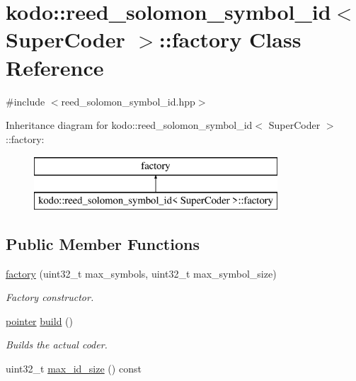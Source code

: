 \hypertarget{classkodo_1_1reed__solomon__symbol__id_1_1factory}{\section{kodo\-:\-:reed\-\_\-solomon\-\_\-symbol\-\_\-id$<$ Super\-Coder $>$\-:\-:factory Class Reference}
\label{classkodo_1_1reed__solomon__symbol__id_1_1factory}
}


{\ttfamily \#include $<$reed\-\_\-solomon\-\_\-symbol\-\_\-id.\-hpp$>$}

Inheritance diagram for kodo\-:\-:reed\-\_\-solomon\-\_\-symbol\-\_\-id$<$ Super\-Coder $>$\-:\-:factory\-:\begin{figure}[H]
\begin{center}
\leavevmode
\includegraphics[height=2.000000cm]{classkodo_1_1reed__solomon__symbol__id_1_1factory}
\end{center}
\end{figure}
\subsection*{Public Member Functions}
\begin{DoxyCompactItemize}
\item 
\hyperlink{classkodo_1_1reed__solomon__symbol__id_1_1factory_a312ce0004c44dd019d862d04c3200d41}{factory} (uint32\-\_\-t max\-\_\-symbols, uint32\-\_\-t max\-\_\-symbol\-\_\-size)
\begin{DoxyCompactList}\small\item\em Factory constructor. \end{DoxyCompactList}\item 
\hyperlink{classkodo_1_1reed__solomon__symbol__id_a92bde6d579c689ee7d8421c12210893e}{pointer} \hyperlink{classkodo_1_1reed__solomon__symbol__id_1_1factory_a26fc77714110496ea90f6b8c6529ab17}{build} ()
\begin{DoxyCompactList}\small\item\em Builds the actual coder. \end{DoxyCompactList}\item 
uint32\-\_\-t \hyperlink{classkodo_1_1reed__solomon__symbol__id_1_1factory_ab8234f47c8489fdfb870c2a31e7aa2ed}{max\-\_\-id\-\_\-size} () const 
\begin{DoxyCompactList}\small\item\em \end{DoxyCompactList}\end{DoxyCompactItemize}


